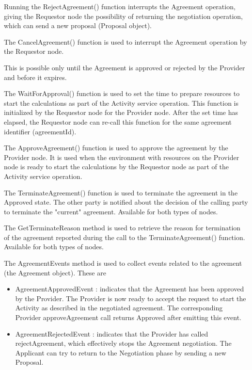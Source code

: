 \begin{enumerate}
\begin{enumerate}
Running the RejectAgreement() function interrupts the Agreement operation, giving the Requestor node the possibility of returning the negotiation operation,
which can send a new proposal (Proposal object).

The CancelAgreement() function is used to interrupt the Agreement operation by the Requestor node.

This is possible only until the Agreement is approved or rejected by the Provider and before it expires.

The WaitForApproval() function is used to set the time to prepare resources to start the calculations as part of the Activity service operation.
This function is initialized by the Requestor node for the Provider node. After the set time has elapsed, the Requestor node can
re-call this function for the same agreement identifier (agreementId).

The ApproveAgreement() function is used to approve the agreement by the Provider node. It is used when the environment with
resources on the Provider node is ready to start the calculations by the Requestor node as part of the Activity service operation.

The TerminateAgreement() function is used to terminate the agreement in the Approved state.
The other party is notified about the decision of the calling party to terminate the "current" agreement. Available for both types of nodes.

The GetTerminateReason method is used to retrieve the reason for termination of the agreement reported during the call to the TerminateAgreement() function. Available for both types of nodes.

The AgreementEvents method is used to collect events related to the agreement (the Agreement object). These are

\begin{itemize}

\item AgreementApprovedEvent : 	indicates that the Agreement has been approved by the Provider.
								The Provider is now ready to accept the request to start the Activity
								as described in the negotiated agreement.
								The corresponding Provider approveAgreement call returns Approved after emitting this event.

\item AgreementRejectedEvent : 	indicates that the Provider has called rejectAgreement, which effectively stops the Agreement negotiation.
								The Applicant can try to return to the Negotiation phase by sending a new Proposal.


\end{itemize}
\end{enumerate}
\end{enumerate}
